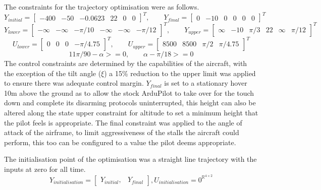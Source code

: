 The constraints for the trajectory optimisation were as follows.
\begin{equation}
Y_{initial}=\begin{bmatrix}-400 &-50&-0.0623&22&0&0\end{bmatrix}^T
, \qquad
Y_{final}=\begin{bmatrix}0 &-10&0&0&0&0\end{bmatrix}^T
\label{eq:boundary_conditions}
\end{equation}
\begin{equation}
Y_{lower}=\begin{bmatrix} -\infty&-\infty&-\pi/10&-\infty&-\infty&-\pi/12\end{bmatrix}^T
, \qquad
Y_{upper}=\begin{bmatrix} \infty&-10&\pi/3&22&\infty&\pi/12\end{bmatrix}^T
\label{eq:state_bounds}
\end{equation}
\begin{equation}
U_{lower}=\begin{bmatrix} 0&0&0&-\pi/4.75\end{bmatrix}^T
,\qquad
U_{upper}=\begin{bmatrix} 8500&8500&\pi/2&\pi/4.75\end{bmatrix}^T
\label{eq:input_bounds}
\end{equation}
\begin{equation}
11\pi/90-\alpha>=0,\qquad \alpha-\pi/18>=0
\label{eq:aoa_constraint}
\end{equation}
The control constraints are determined by the capabilities of the aircraft, with the exception of the tilt angle ($\xi$) a 15\% reduction to the upper limit was applied to ensure there was adequate control margin. $Y_{final}$ is set to a stationary hover 10m above the ground as to allow the stock ArduPilot to take over for the touch down and complete its disarming protocols uninterrupted, this height can also be altered along the state upper constraint for altitude to set a minimum height that the pilot feels is appropriate.
The final constraint was applied to the angle of attack of the airframe, to limit aggressiveness of the stalls the aircraft could perform, this too can be configured to a value the pilot deems appropriate.

The initialisation point of the optimisation was a straight line trajectory with the inputs at zero for all time.
\begin{equation}
Y_{initialisation}=\begin{bmatrix}Y_{initial},&Y_{final}\end{bmatrix},U_{initialisation}=0^{\mathbb{R}^{4 \times 2}}
\label{eq:initialisation}
\end{equation}



